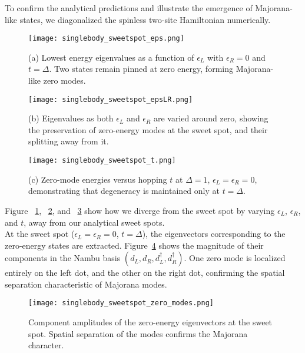 \documentclass[11pt, letterpaper, titlepage]{article}
\begin{document}
To confirm the analytical predictions and illustrate the emergence of Majorana-like states, we diagonalized the spinless two-site Hamiltonian numerically.

\begin{figure}[htbp]
  \centering
  \texttt{[image: singlebody\_sweetspot\_eps.png]}
  \caption{(a) Lowest energy eigenvalues as a function of $\epsilon_L$ with $\epsilon_R = 0$ and $t = \Delta$. Two states remain pinned at zero energy, forming Majorana-like zero modes.}
  \label{fig:sb_epsL}
\end{figure}

\begin{figure}[htbp]
  \centering
  \texttt{[image: singlebody\_sweetspot\_epsLR.png]}
  \caption{(b) Eigenvalues as both $\epsilon_L$ and $\epsilon_R$ are varied around zero, showing the preservation of zero-energy modes at the sweet spot, and their splitting away from it.}
  \label{fig:sb_epsLR}
\end{figure}

\begin{figure}[htbp]
  \centering
  \texttt{[image: singlebody\_sweetspot\_t.png]}
  \caption{(c) Zero-mode energies versus hopping $t$ at $\Delta = 1$, $\epsilon_L = \epsilon_R = 0$, demonstrating that degeneracy is maintained only at $t = \Delta$.}
  \label{fig:sb_tscan}
\end{figure}
\newpage
Figure ~\ref{fig:sb_epsL}, ~\ref{fig:sb_epsLR}, and ~\ref{fig:sb_tscan} show how we diverge from the sweet spot by varying $\epsilon_L$, $\epsilon_R$, and $t$, away from our analytical sweet spots.\\
At the sweet spot ($\epsilon_L = \epsilon_R = 0$, $t = \Delta$), the eigenvectors corresponding to the zero-energy states are extracted. Figure~\ref{fig:sb_zero_modes} shows the magnitude of their components in the Nambu basis $(d_L, d_R, d_L^\dagger, d_R^\dagger)$. One zero mode is localized entirely on the left dot, and the other on the right dot, confirming the spatial separation characteristic of Majorana modes.

\begin{figure}[htbp]
  \centering
  \texttt{[image: singlebody\_sweetspot\_zero\_modes.png]}
  \caption{Component amplitudes of the zero-energy eigenvectors at the sweet spot. Spatial separation of the modes confirms the Majorana character.}
  \label{fig:sb_zero_modes}
\end{figure}
\end{document}
